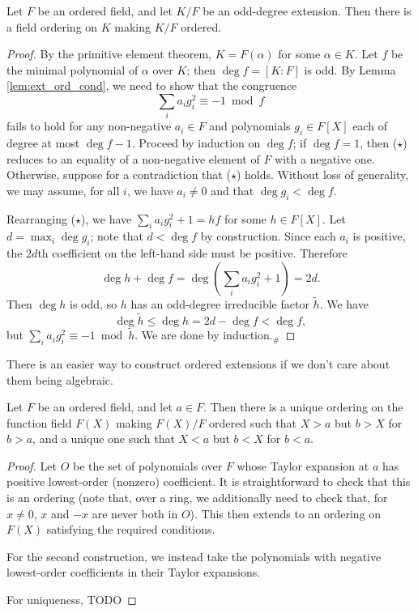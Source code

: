 \begin{lemma}
  \label{lem:ext_ord_odd_deg}
  \leanok
  Let $F$ be an ordered field, and let $K/F$ be an odd-degree extension. Then there is a field ordering on $K$ making $K/F$ ordered.
\end{lemma}
\begin{proof}
  \leanok
  By the primitive element theorem, $K=F(\alpha)$ for some $\alpha\in K$. Let $f$ be the minimal polynomial of $\alpha$ over $K$; then $\deg f=[K:F]$ is odd. By Lemma \ref{lem:ext_ord_cond}, we need to show that the congruence
  \[\sum_ia_ig_i^2\equiv-1\bmod f\tag{$\star$}\]
  fails to hold for any non-negative $a_i\in F$ and polynomials $g_i\in F[X]$ each of degree at most $\deg f-1$. Proceed by induction on $\deg f$; if $\deg f=1$, then ($\star$) reduces to an equality of a non-negative element of $F$ with a negative one. Otherwise, suppose for a contradiction that ($\star$) holds. Without loss of generality, we may assume, for all $i$, we have $a_i\neq0$ and that $\deg g_i<\deg f$.
  
  Rearranging ($\star$), we have $\sum_ia_ig_i^2+1=hf$ for some $h\in F[X]$. Let $d=\max_i\deg g_i$; note that $d<\deg f$ by construction. Since each $a_i$ is positive, the $2d$th coefficient on the left-hand side must be positive. Therefore
  \[\deg h+\deg f=\deg(\sum_ia_ig_i^2+1)=2d.\]
  Then $\deg h$ is odd, so $h$ has an odd-degree irreducible factor $\tilde h$. We have
  \[\deg\tilde h\leq\deg h=2d-\deg f<\deg f,\]
  but $\sum_ia_ig_i^2\equiv-1\bmod\tilde h$. We are done by induction.$_\#$
\end{proof}

There is an easier way to construct ordered extensions if we don't care about them being algebraic.

\begin{lemma}
  \label{lem:order_fun_field}
  Let $F$ be an ordered field, and let $a\in F$. Then there is a unique ordering on the function field $F(X)$ making $F(X)/F$ ordered such that $X>a$ but $b>X$ for $b>a$, and a unique one such that $X<a$ but $b<X$ for $b<a$.
\end{lemma}
\begin{proof}
  Let $O$ be the set of polynomials over $F$ whose Taylor expansion at $a$ has positive lowest-order (nonzero) coefficient. It is straightforward to check that this is an ordering (note that, over a ring, we additionally need to check that, for $x\neq0$, $x$ and $-x$ are never both in $O$). This then extends to an ordering on $F(X)$ satisfying the required conditions.

  For the second construction, we instead take the polynomials with negative lowest-order coefficients in their Taylor expansions.

  For uniqueness, TODO
\end{proof}

